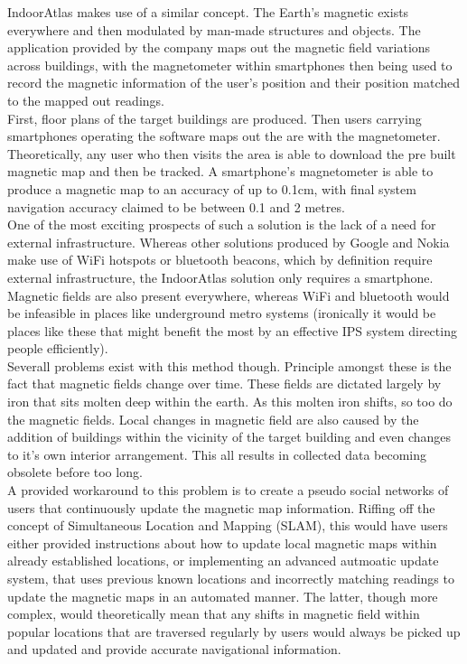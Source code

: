 \documentclass[main.tex]{subfiles}
\begin{document}
IndoorAtlas makes use of a similar concept. The Earth's magnetic exists everywhere and then modulated by man-made structures and objects. The application provided by the company maps out the magnetic field variations across buildings, with the magnetometer within smartphones then being used to record the magnetic information of the user's position and their position matched to the mapped out readings.\\
 
 First, floor plans of the target buildings are produced. Then users carrying smartphones operating the software maps out the are with the magnetometer. Theoretically, any user who then visits the area is able to download the pre built magnetic map and then be tracked. A smartphone's magnetometer is able to produce a magnetic map to an accuracy of up to 0.1cm, with final system navigation accuracy claimed to be between 0.1 and 2 metres. \\
 
 One of the most exciting prospects of such a solution is the lack of a need for external infrastructure. Whereas other solutions produced by Google and Nokia make use of WiFi hotspots or bluetooth beacons, which by definition require external infrastructure, the IndoorAtlas solution only requires a smartphone. Magnetic fields are also present everywhere, whereas WiFi and bluetooth would be infeasible in places like underground metro systems (ironically it would be places like these that might benefit the most by an effective IPS system directing people efficiently).\\
 
 Severall problems exist with this method though. Principle amongst these is the fact that magnetic fields change over time. These fields are dictated largely by iron that sits molten deep within the earth. As this molten iron shifts, so too do the magnetic fields. Local changes in magnetic field are also caused by the addition of buildings within the vicinity of the target building and even changes to it's own interior arrangement. This all results in collected data becoming obsolete before too long.\\
 
 A provided workaround to this problem is to create a pseudo social networks of users that continuously update the magnetic map information. Riffing off the concept of Simultaneous Location and Mapping (SLAM), this would have users either provided instructions about how to update local magnetic maps within already established locations, or implementing an advanced autmoatic update system, that uses previous known locations and incorrectly matching readings to update the magnetic maps in an automated manner. The latter, though more complex, would theoretically mean that any shifts in magnetic field within popular locations that are traversed regularly by users would always be picked up and updated and provide accurate navigational information.\\
 
\end{document}
